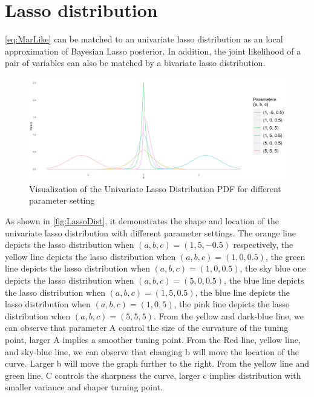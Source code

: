 \section{Lasso distribution}
\autoref{eq:MarLike} can be matched to an univariate lasso distribution as an local approximation of Bayesian Lasso posterior. In addition, the joint likelihood of a pair of variables can also be matched by a bivariate lasso distribution.
         
\begin{figure}[h]
	\includegraphics[width=\linewidth]{Lasso_distribution}
	\caption{Visualization of the Univariate Lasso Distribution PDF for different parameter setting}
	\label{fig:LassoDist}
\end{figure}
As shown in \autoref{fig:LassoDist},  it demonstrates the shape and location of the univariate lasso distribution with different parameter settings. The orange line depicts the lasso distribution when $(a,b,c) = (1,5,-0.5)$ respectively, the yellow line depicts the lasso distribution when $(a,b,c) = (1,0,0.5)$, the green line depicts the lasso distribution when $(a,b,c) = (1,0,0.5)$, the sky blue one depicts the lasso distribution when $(a,b,c) = (5,0,0.5)$, the blue line depicts the lasso distribution when $(a,b,c) = (1,5,0.5)$, the blue line depicts the lasso distribution when $(a,b,c) = (1,0,5)$, the pink line depicts the lasso distribution when  $(a,b,c) = (5,5,5)$. 
From the yellow and dark-blue line, we can observe that parameter A control the size of the curvature of the tuning point, larger A implies a smoother tuning point.
From the Red line, yellow line, and sky-blue line, we can observe that changing b will move the location of the curve. Larger b will move the graph further to the right.
From the yellow line and green line, C controls the sharpness the curve, larger c implies distribution with smaller variance and shaper turning point.



